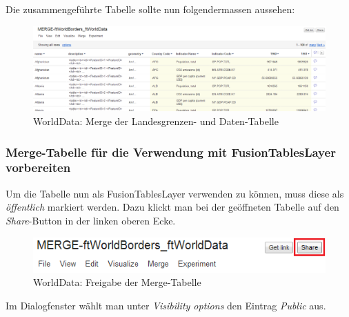 Die zusammengeführte Tabelle sollte nun folgendermassen aussehen:

\begin{figure}[H]
	\centering
	\includegraphics[scale=0.4]{images/usecase1-worlddata/documentation/worlddata-merge_done.png}
	\caption{WorldData: Merge der Landesgrenzen- und Daten-Tabelle}
	\label{worlddata-merge_done}
\end{figure}

\subsubsection{Merge-Tabelle für die Verwendung mit FusionTablesLayer vorbereiten}
Um die Tabelle nun als FusionTablesLayer verwenden zu können, muss diese als \emph{öffentlich} markiert werden. Dazu klickt man bei der geöffneten Tabelle auf den \emph{Share}-Button in der linken oberen Ecke.

\begin{figure}[H]
	\centering
	\includegraphics{images/usecase1-worlddata/documentation/worlddata-prepare_fusiontableslayer1.png}
	\caption{WorldData: Freigabe der Merge-Tabelle}
	\label{worlddata-prepare_fusiontableslayer1}
\end{figure}

Im Dialogfenster wählt man unter \emph{Visibility options} den Eintrag \emph{Public} aus.

